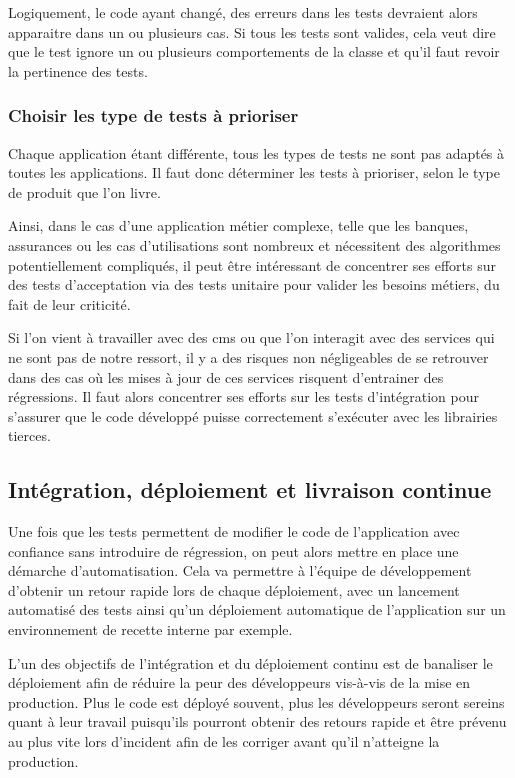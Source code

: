 Logiquement, le code ayant changé, des erreurs dans les tests devraient alors apparaitre dans un ou plusieurs cas. Si tous les tests sont valides, cela veut dire que le test ignore un ou plusieurs comportements de la classe et qu'il faut revoir la pertinence des tests.

\subsubsection{Choisir les type de tests à prioriser}

Chaque application étant différente, tous les types de tests ne sont pas adaptés à toutes les applications. Il faut donc déterminer les tests à prioriser, selon le type de produit que l'on livre.

Ainsi, dans le cas d'une application métier complexe, telle que les banques, assurances ou les cas d'utilisations sont nombreux et nécessitent des algorithmes potentiellement compliqués, il peut être intéressant de concentrer ses efforts sur des tests d'acceptation via des tests unitaire pour valider les besoins métiers, du fait de leur criticité.

Si l'on vient à travailler avec des \gls{cms} ou que l'on interagit avec des services qui ne sont pas de notre ressort, il y a des risques non négligeables de se retrouver dans des cas où les mises à jour de ces services risquent d'entrainer des régressions. Il faut alors concentrer ses efforts sur les tests d'intégration pour s'assurer que le code développé puisse correctement s'exécuter avec les librairies tierces.

\subsection{Intégration, déploiement et livraison continue}

Une fois que les tests permettent de modifier le code de l'application avec confiance sans introduire de régression, on peut alors mettre en place une démarche d'automatisation. Cela va permettre à l'équipe de développement d'obtenir un retour rapide lors de chaque déploiement, avec un lancement automatisé des tests ainsi qu'un déploiement automatique de l'application sur un environnement de recette interne par exemple.

L'un des objectifs de l'intégration et du déploiement continu est de banaliser le déploiement afin de réduire la peur des développeurs vis-à-vis de la mise en production. Plus le code est déployé souvent, plus les développeurs seront sereins quant à leur travail puisqu'ils pourront obtenir des retours rapide et être prévenu au plus vite lors d'incident afin de les corriger avant qu'il n'atteigne la production.

